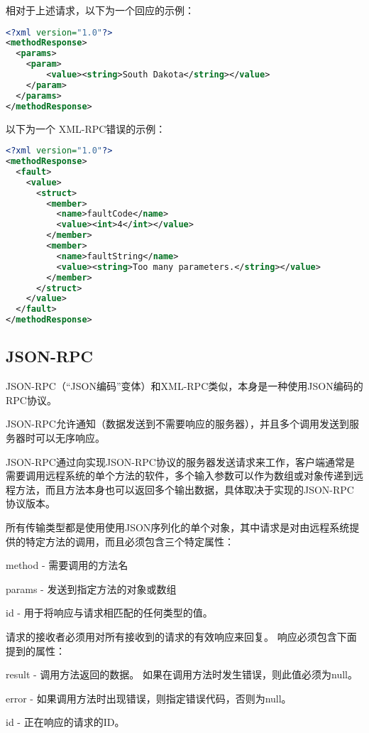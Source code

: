 相对于上述请求，以下为一个回应的示例：

\begin{lstlisting}[language=XML]
<?xml version="1.0"?>
<methodResponse>
  <params>
    <param>
        <value><string>South Dakota</string></value>
    </param>
  </params>
</methodResponse>
\end{lstlisting}

以下为一个 XML-RPC错误的示例：

\begin{lstlisting}[language=XML]
<?xml version="1.0"?>
<methodResponse>
  <fault>
    <value>
      <struct>
        <member>
          <name>faultCode</name>
          <value><int>4</int></value>
        </member>
        <member>
          <name>faultString</name>
          <value><string>Too many parameters.</string></value>
        </member>
      </struct>
    </value>
  </fault>
</methodResponse>
\end{lstlisting}


\subsection{JSON-RPC}

JSON-RPC（“JSON编码”变体）和XML-RPC类似，本身是一种使用JSON编码的RPC协议。

JSON-RPC允许通知（数据发送到不需要响应的服务器），并且多个调用发送到服务器时可以无序响应。

JSON-RPC通过向实现JSON-RPC协议的服务器发送请求来工作，客户端通常是需要调用远程系统的单个方法的软件，多个输入参数可以作为数组或对象传递到远程方法，而且方法本身也可以返回多个输出数据，具体取决于实现的JSON-RPC协议版本。

所有传输类型都是使用使用JSON序列化的单个对象，其中请求是对由远程系统提供的特定方法的调用，而且必须包含三个特定属性：

\begin{compactitem}
\item method - 需要调用的方法名


\item params - 发送到指定方法的对象或数组


\item id - 用于将响应与请求相匹配的任何类型的值。

\end{compactitem}

请求的接收者必须用对所有接收到的请求的有效响应来回复。 响应必须包含下面提到的属性：

\begin{compactitem}
\item result - 调用方法返回的数据。 如果在调用方法时发生错误，则此值必须为null。

\item error - 如果调用方法时出现错误，则指定错误代码，否则为null。


\item id - 正在响应的请求的ID。

\end{compactitem}

